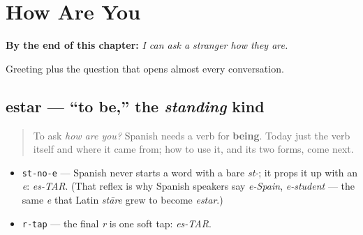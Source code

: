 
\chapter{How Are You}
\label{ch:how-are-you}

\begin{chapteropening}
\textbf{By the end of this chapter:} \emph{I can ask a stranger how they are.}

Greeting plus the question that opens almost every conversation.
\end{chapteropening}

\section[estar]{estar — \textquotedblleft{}to be,\textquotedblright{} the \emph{standing} kind}

\label{lesson:ES-C04-estar}



\begin{quote}
To ask \emph{how are you?} Spanish needs a verb for \textbf{being}. Today just the verb itself and where it came from; how to use it, and its two forms, come next.
\end{quote}

\begin{sounds}
\begin{itemize}
\raggedright
  \item \texttt{st-no-e} — Spanish never starts a word with a bare \emph{st-}; it props it up with an \emph{e}: \emph{es-TAR}. (That reflex is why Spanish speakers say \emph{e-Spain}, \emph{e-student} — the same \emph{e} that Latin \emph{stāre} grew to become \emph{estar}.)
  \item \texttt{r-tap} — the final \emph{r} is one soft tap: \emph{es-TAR}.
\end{itemize}
\end{sounds}

